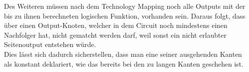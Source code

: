 \documentclass[11pt, a4paper, german]{article}
\newcommand{\TM}{Technology  Mapping }
\begin{document}
 Des Weiteren müssen nach dem \TM noch alle Outputs mit der bis zu ihnen berechneten logischen Funktion, vorhanden sein. Daraus folgt, dass über einen Output-Knoten, welcher in dem Circuit noch mindestens einen Nachfolger hat, nicht gematcht werden darf, weil sonst ein nicht erlaubter Seitenoutput entstehen würde.\\
 Dies lässt sich dadurch sicherstellen, dass man eine seiner ausgehenden Kanten als konstant deklariert, wie das bereits bei den zu langen Kanten geschehen ist. 
 

\end{document}
